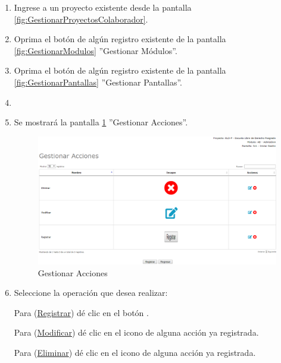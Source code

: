 			\begin{enumerate}
				
			\item Ingrese a un proyecto existente desde la pantalla \ref{fig:GestionarProyectosColaborador}.
	
			\item Oprima el botón \IUPantallas{} de algún registro existente de la pantalla \ref{fig:GestionarModulos} ''Gestionar Módulos''.
			
			\item Oprima el botón \IUAcciones{} de algún registro existente de la pantalla \ref{fig:GestionarPantallas} ''Gestionar Pantallas''.
			
			\item \item Se mostrará la pantalla \ref{fig:GestionarAcciones} ''Gestionar Acciones''.

			\begin{figure}[h!]
				\begin{center}
					\includegraphics[scale=0.5]{roles/lider/pantallas/acciones/pantallas/IU11-1-1gestionarAcciones}
					\caption{Gestionar Acciones}
					\label{fig:GestionarAcciones}
				\end{center}
			\end{figure}
		
				\item Seleccione la operación que desea realizar:
			
			Para (\hyperlink{cv:registrarAccion}{Registrar}) dé clic en el botón \IURegistrar.
			
			Para (\hyperlink{cv:modificarAccion}{Modificar}) dé clic en el icono \IUEditar{} de alguna acción ya registrada.
			
			Para (\hyperlink{cv:eliminarAccion}{Eliminar}) dé clic en el icono \IUBotonEliminar{} de alguna acción ya registrada.
			
			\end{enumerate}